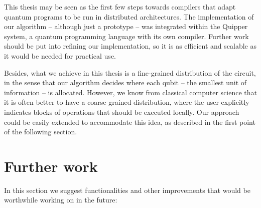 This thesis may be seen as the first few steps towards compilers that adapt quantum programs to be run in distributed architectures. The implementation of our algorithm -- although just a prototype -- was integrated within the Quipper system, a quantum programming language with its own compiler. Further work should be put into refining our implementation, so it is as efficient and scalable as it would be needed for practical use. 

Besides, what we achieve in this thesis is a fine-grained distribution of the circuit, in the sense that our algorithm decides where each qubit -- the smallest unit of information -- is allocated. However, we know from classical computer science that it is often better to have a coarse-grained distribution, where the user explicitly indicates blocks of operations that should be executed locally. Our approach could be easily extended to accommodate this idea, as described in the first point of the following section.

\section{Further work}
\label{FurtherWork}

In this section we suggest functionalities and other improvements that would be worthwhile working on in the future:

